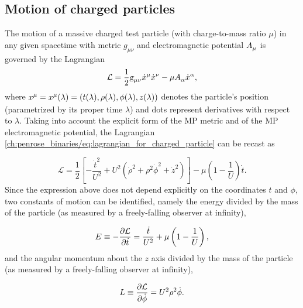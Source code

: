 \subsection{Motion of charged particles}

The motion of a massive charged test particle (with charge-to-mass ratio $\mu$) in any given spacetime with metric $g_{\mu \nu}$ and electromagnetic potential $\tens{A}{}{\mu}$ is governed by the Lagrangian
\begin{equation}
    \mathcal{L} = \frac{1}{2}\mtrtens{\mu}{\nu}\tens{\dot{x}}{\mu}{}\tens{\dot{x}}{\nu}{} - \mu \tens{A}{}{\alpha}\tens{\dot{x}}{\alpha}{},
    \label{ch:penrose_binaries/eq:lagrangian_for_charged_particle}
\end{equation}
%
where $\tens{x}{\mu}{} = \tens{x}{\mu}{}(\lambda) =  \left(t(\lambda), \rho(\lambda), \phi(\lambda), z(\lambda)\right)$ denotes the particle's position (parametrized by its proper time $\lambda$) and dots represent derivatives with respect to $\lambda$. Taking into account the explicit form of the MP metric and of the MP electromagnetic potential, the Lagrangian \eqref{ch:penrose_binaries/eq:lagrangian_for_charged_particle} can be recast as~\cite{RYZNER2015}

\begin{equation}
    \mathcal{L} = \frac{1}{2}\left[-\frac{\dot{t}^2}{U^2} + U^2\left( \dot{\rho}^2 + \rho^2\dot{\phi}^2 + \dot{z}^2 \right) \right] - \mu\left(1-\frac{1}{U}\right)\dot{t}.
    \label{ch:penrose_binaries/eq:explicit_lagrangian_for_charged_particle}
\end{equation}
%
Since the expression above does not depend explicitly on the coordinates $t$ and $\phi$, two constants of motion can be identified, namely the energy divided by the mass of the particle (as measured by a freely-falling observer at infinity),

\begin{equation}
    E \equiv -\frac{\partial \mathcal{L}}{\partial \dot{t}} = \frac{\dot{t}}{U^2} + \mu\left(1-\frac{1}{U}\right),
    \label{ch:penrose_binaries/eq:conserved_energy}
\end{equation}
%
and the angular momentum about the $z$ axis divided by the mass of the particle (as measured by a freely-falling observer at infinity),

\begin{equation}
    L \equiv \frac{\partial \mathcal{L}}{\partial \dot{\phi}} = U^2 \rho^2 \dot{\phi}.
    \label{ch:penrose_binaries/eq:conserved_momentum}
\end{equation}


